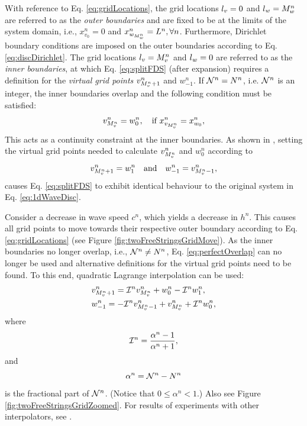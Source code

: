 \documentclass[fleqn]{jaes}
\begin{document}
With reference to Eq. \eqref{eq:gridLocations}, the grid locations ${l_v} = 0$ and ${l_w} = M_w^n$ are referred to as the \textit{outer boundaries} and are fixed to be at the limits of the system domain, i.e., $x_{v_0}^n = 0$ and $x_{w_{M_w^n}}^n = L^n, \forall n$. Furthermore, Dirichlet boundary conditions are imposed on the outer boundaries according to Eq. \eqref{eq:discDirichlet}. 
The grid locations ${l_v} = M_v^n$ and ${l_w} = 0$  are referred to as the \textit{inner boundaries}, at which Eq. \eqref{eq:splitFDS} (after expansion) requires a definition for the \textit{virtual grid points} $v_{M_v^n+1}^n$ and $w_{-1}^n$. If $\mathcal{N}^n = N^n$, i.e. $\mathcal{N}^n$ is an integer, the inner boundaries overlap and the following condition must be satisfied:
\begin{equation}\label{eq:rigid}
    v_{\Mv}^n = w_0^n, \quad \text{if}\  x_{v_{\Mv}}^n =  x_{w_0}^n,
\end{equation}
This acts as a continuity constraint at the inner boundaries. As shown in
\cite{Willemsen2021a}, setting the virtual grid points needed to calculate $v_{M_v^n}^n$ and $w_0^n$ according to
\begin{equation}\label{eq:perfectOverlap}
    v_{\Mv+1}^n = w_1^n \qaq w_{-1}^n = v_{\Mv-1}^n,
\end{equation}
causes Eq. \eqref{eq:splitFDS} to exhibit identical behaviour to the original system in Eq. \eqref{eq:1dWaveDisc}.

Consider a decrease in wave speed $c^n$, which yields a decrease in $h^n$. This causes all grid points to move towards their respective outer boundary according to Eq. \eqref{eq:gridLocations} (see Figure \ref{fig:twoFreeStringsGridMove}). As the inner boundaries no longer overlap, i.e., $\mathcal{N}^n \neq N^n$, Eq. \eqref{eq:perfectOverlap} can no longer be used and alternative definitions for the virtual grid points need to be found. To this end, quadratic
Lagrange interpolation can be used:
\begin{subequations}\label{eq:connectionInterpol}
    \begin{align}
            &v_{\Mv+1}^n = \Aterm v_{\Mv}^n + w_0^n - \Aterm w_1^n,
        \label{eq:calcUMP1}\\
            &w_{-1}^n = -\Aterm v_{\Mv-1}^n + v_{\Mv}^n+\Aterm w_{0}^n,\label{eq:calcWM1}
    \end{align}
\end{subequations}
where
\begin{equation}\label{eq:aterm}
    \Aterm = \frac{\alpha^n-1}{\alpha^n+1},
\end{equation}
and 
\begin{equation}\label{eq:alphaDef}
    \alpha^n = \Nfrac^n - N^n
\end{equation}
is the fractional part of $\mathcal{N}^n$. (Notice that $0\leq \alpha^n < 1$.) Also see Figure \ref{fig:twoFreeStringsGridZoomed}. For results of experiments with other interpolators, see \cite[Sec. 12.3]{Willemsen2021Thesis}.
\end{document}
